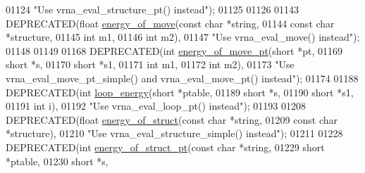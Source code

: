 \begin{DoxyCode}
01124            \textcolor{stringliteral}{"Use vrna\_eval\_structure\_pt() instead"});
01125 
01126 
01143 DEPRECATED(\textcolor{keywordtype}{float} \hyperlink{group__eval__deprecated_ga539ecaed89730f7644c202f304d7529b}{energy\_of\_move}(\textcolor{keyword}{const} \textcolor{keywordtype}{char}  *\textcolor{keywordtype}{string},
01144                                 \textcolor{keyword}{const} \textcolor{keywordtype}{char}  *structure,
01145                                 \textcolor{keywordtype}{int}         m1,
01146                                 \textcolor{keywordtype}{int}         m2),
01147            \textcolor{stringliteral}{"Use vrna\_eval\_move() instead"});
01148 
01149 
01168 DEPRECATED(\textcolor{keywordtype}{int} \hyperlink{group__eval__deprecated_ga49e0ee561be69faf0568213546f6a53f}{energy\_of\_move\_pt}(\textcolor{keywordtype}{short}  *pt,
01169                                  \textcolor{keywordtype}{short}  *s,
01170                                  \textcolor{keywordtype}{short}  *s1,
01171                                  \textcolor{keywordtype}{int}    m1,
01172                                  \textcolor{keywordtype}{int}    m2),
01173            \textcolor{stringliteral}{"Use vrna\_eval\_move\_pt\_simple() and vrna\_eval\_move\_pt() instead"});
01174 
01188 DEPRECATED(\textcolor{keywordtype}{int}   \hyperlink{group__eval__deprecated_ga507d4fd93f4b398d793ba2402731388d}{loop\_energy}(\textcolor{keywordtype}{short}  *ptable,
01189                              \textcolor{keywordtype}{short}  *s,
01190                              \textcolor{keywordtype}{short}  *s1,
01191                              \textcolor{keywordtype}{int}    i),
01192            \textcolor{stringliteral}{"Use vrna\_eval\_loop\_pt() instead"});
01193 
01208 DEPRECATED(\textcolor{keywordtype}{float} \hyperlink{group__eval__deprecated_gac2b37fea2145c94d925a3f33378ef87b}{energy\_of\_struct}(\textcolor{keyword}{const} \textcolor{keywordtype}{char}  *\textcolor{keywordtype}{string},
01209                                   \textcolor{keyword}{const} \textcolor{keywordtype}{char}  *structure),
01210            \textcolor{stringliteral}{"Use vrna\_eval\_structure\_simple() instead"});
01211 
01228 DEPRECATED(\textcolor{keywordtype}{int} \hyperlink{group__eval__deprecated_ga27ce6f68512d43bf1fe14a06c9d76d5c}{energy\_of\_struct\_pt}(\textcolor{keyword}{const} \textcolor{keywordtype}{char} *\textcolor{keywordtype}{string},
01229                                    \textcolor{keywordtype}{short}      *ptable,
01230                                    \textcolor{keywordtype}{short}      *s,

\end{DoxyCode}
